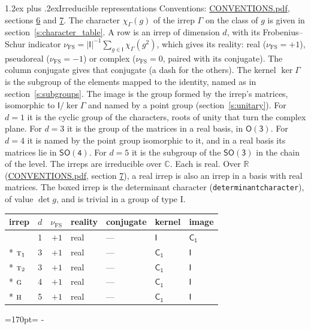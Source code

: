 \documentclass[10pt,a4paper]{article}
\makeatletter
\renewcommand\section{\@startsection{section}{1}{\z@}{-3ex plus -1ex minus -.2ex}%
  {1.2ex plus .2ex}{\normalfont\large\sffamily\bfseries\color{parttitle}}}
\newcommand{\needspace}[1]{\par\penalty-100\begingroup\dimen0=#1\relax\dimen2=\pagegoal
  \advance\dimen2-\pagetotal\ifdim\dimen0>\dimen2\relax\ifdim\dimen2>0pt\vfil\break\fi\fi
  \endgroup}
\numberwithin{equation}{section}
\newcommand{\grp}[1]{\mathsf{#1}}
\newcommand{\irr}[1]{\text{\normalfont\scshape #1}}
\newcommand{\detbox}[1]{{\setlength{\fboxsep}{1pt}\fbox{#1}}}
\newcommand{\irchar}[1]{\chi_{#1}}
\newcommand{\fsind}{\nu_{\mathrm{FS}}}
\makeatother
\begin{document}
\section{Irreducible representations}\label{s:irreps}
Conventions: \href{../../CONVENTIONS.pdf}{CONVENTIONS.pdf}, sections \href{../../CONVENTIONS.pdf\#conv.6}{6} and \href{../../CONVENTIONS.pdf\#conv.7}{7}.
\leavevmode\label{n:function.character}\label{n:irrep.Gamma}The character $\irchar{\Gamma}(g)$ of the irrep $\Gamma$ on the class of $g$ is given in section~\ref{s:character_table}.
\leavevmode\label{n:index.dimension}\label{n:index.frobenius}\label{n:head.irrep}\label{n:head.reality}A row is an irrep of dimension $d$, with its Frobenius--Schur indicator $\fsind = |\grp{I}|^{-1}\allowbreak\sum_{g\in\grp{I}}\irchar{\Gamma}(g^2)$, which gives its reality: real ($\fsind = +1$), pseudoreal ($\fsind = -1$) or complex ($\fsind = 0$, paired with its conjugate). \label{n:head.conjugate}The column conjugate gives that conjugate (a dash for the others). \label{n:head.kernel}The kernel $\ker\Gamma$ is the subgroup of the elements mapped to the identity, named as in section~\ref{s:subgroups}. \label{n:head.image}The image is the group formed by the irrep's matrices, isomorphic to $\grp{I}/\ker\Gamma$ and named by a point group (section~\ref{s:unitary}). For $d = 1$ it is the cyclic group of the characters, roots of unity that turn the complex plane. For $d = 3$ it is the group of the matrices in a real basis, in \href{O3.pdf}{$\grp{O(3)}$}. For $d = 4$ it is named by the point group isomorphic to it, and in a real basis its matrices lie in $\grp{SO(4)}$. For $d = 5$ it is the subgroup of the \href{SO3.pdf}{$\grp{SO(3)}$} in the chain of the level. The irreps are irreducible over $\mathbb{C}$. Each is real. Over $\mathbb{R}$ (\href{../../CONVENTIONS.pdf}{CONVENTIONS.pdf}, section \href{../../CONVENTIONS.pdf\#conv.7}{7}), a real irrep is also an irrep in a basis with real matrices. \label{n:mark.determinant}The boxed irrep is the determinant character (\texttt{determinantcharacter}), of value $\det g$, and is trivial in a group of type I.
\setlength{\emergencystretch}{2em}\par\setlength{\emergencystretch}{0pt}
{\small\renewcommand{\arraystretch}{1.25}\begin{longtable}{@{}lrrllll@{}}\toprule
irrep & $d$ & $\fsind$ & reality & conjugate & kernel & image\\\midrule\endhead
\bottomrule\endfoot\endlastfoot
\detbox{$\irr{a}$} & 1 & $+1$ & real & --- & \href{I.pdf}{$\grp{I}$} & \href{C1.pdf}{$\grp{C_{1}}$}\\*
$\irr{t}_{1}$ & 3 & $+1$ & real & --- & \href{C1.pdf}{$\grp{C_{1}}$} & \href{I.pdf}{$\grp{I}$}\\*
$\irr{t}_{2}$ & 3 & $+1$ & real & --- & \href{C1.pdf}{$\grp{C_{1}}$} & \href{I.pdf}{$\grp{I}$}\\*
$\irr{g}$ & 4 & $+1$ & real & --- & \href{C1.pdf}{$\grp{C_{1}}$} & \href{I.pdf}{$\grp{I}$}\\*
$\irr{h}$ & 5 & $+1$ & real & --- & \href{C1.pdf}{$\grp{C_{1}}$} & \href{I.pdf}{$\grp{I}$}\\
\bottomrule\end{longtable}}
\needspace{170pt}
\end{document}
